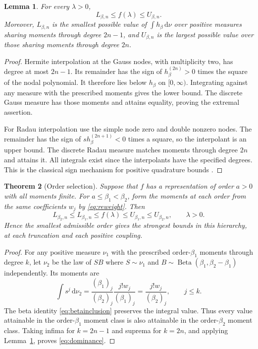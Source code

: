 \documentclass[11pt]{article}
\newtheorem{theorem}{Theorem}[section]
\newtheorem{lemma}[theorem]{Lemma}
\theoremstyle{definition}
\newcommand{\dd}{\,\mathrm d}
\numberwithin{equation}{section}
\begin{document}
\begin{lemma}\label{lem:extremal}
For every $\lambda>0$,
\[
 L_{\beta,n}\le f(\lambda)\le U_{\beta,n}.
\]
Moreover, $L_{\beta,n}$ is the smallest possible value of
$\int h_\beta\dd\nu$ over positive measures sharing moments through
degree $2n-1$, and $U_{\beta,n}$ is the largest possible value over
those sharing moments through degree $2n$.
\end{lemma}
\begin{proof}
Hermite interpolation at the Gauss nodes, with multiplicity two, has
degree at most $2n-1$. Its remainder has the sign of
$h_\beta^{(2n)}>0$ times the square of the nodal polynomial.
It therefore lies below $h_\beta$ on $[0,\infty)$.
Integrating against any measure with the prescribed moments gives
the lower bound. The discrete Gauss measure has those moments and
attains equality, proving the extremal assertion.

For Radau interpolation use the simple node zero and double nonzero
nodes. The remainder has the sign of
$s h_\beta^{(2n+1)}<0$ times a square, so the interpolant is an upper
bound. The discrete Radau measure matches moments through degree $2n$
and attains it. All integrals exist since the interpolants have the
specified degrees. This is the classical sign mechanism for positive
quadrature bounds \cite{Gautschi,LRW}.
\end{proof}

\begin{theorem}[Order selection]\label{thm:selection}
Suppose that $f$ has a representation of order $a>0$ with all moments
finite. For $a\le\beta_1<\beta_2$, form the moments at each order from
the same coefficients $w_j$ by \eqref{eq:reweight}. Then
\begin{equation}\label{eq:dominance}
 L_{\beta_2,n}\le L_{\beta_1,n}\le f(\lambda)
 \le U_{\beta_1,n}\le U_{\beta_2,n},\qquad\lambda>0.
\end{equation}
Hence the smallest admissible order gives the strongest bounds in
this hierarchy, at each truncation and each positive coupling.
\end{theorem}
\begin{proof}
For any positive measure $\nu_1$ with the prescribed order-$\beta_1$
moments through degree $k$, let $\nu_2$ be the law of $SB$ where
$S\sim\nu_1$ and
$B\sim\operatorname{Beta}(\beta_1,\beta_2-\beta_1)$ independently.
Its moments are
\[
 \int s^j\dd\nu_2=\frac{(\beta_1)_j}{(\beta_2)_j}
                   \frac{j!w_j}{(\beta_1)_j}
                 =\frac{j!w_j}{(\beta_2)_j},\qquad j\le k.
\]
The beta identity \eqref{eq:betainclusion} preserves the integral value.
Thus every value attainable in the order-$\beta_1$ moment class is
also attainable in the order-$\beta_2$ moment class. Taking infima
for $k=2n-1$ and suprema for $k=2n$, and applying
Lemma~\ref{lem:extremal}, proves \eqref{eq:dominance}.
\end{proof}
\end{document}
